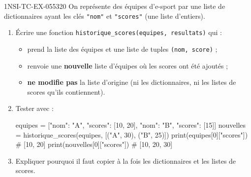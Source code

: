 \begin{exercice}{1NSI-TC-EX-055}{3}{20}
On représente des équipes d'e-sport par une liste de dictionnaires ayant les clés
\lstinline{"nom"} et \lstinline{"scores"} (une liste d'entiers).

\begin{enumerate}
  \item Écrire une fonction \lstinline{historique_scores(equipes, resultats)} qui :
        \begin{itemize}
          \item prend la liste des équipes et une liste de tuples
                \lstinline{(nom, score)} ;
          \item renvoie une \textbf{nouvelle} liste d'équipes où les scores ont été
                ajoutés ;
          \item \textbf{ne modifie pas} la liste d'origine (ni les dictionnaires,
                ni les listes de scores qu'ils contiennent).
        \end{itemize}
  \item Tester avec :
\begin{python}
equipes = [{"nom": "A", "scores": [10, 20]},
            {"nom": "B", "scores": [15]}]
nouvelles = historique_scores(equipes, [("A", 30), ("B", 25)])
print(equipes[0]["scores"])   # [10, 20]
print(nouvelles[0]["scores"]) # [10, 20, 30]
\end{python}
  \item Expliquer pourquoi il faut copier à la fois les dictionnaires et les listes
        de scores.
\end{enumerate}
\end{exercice}
